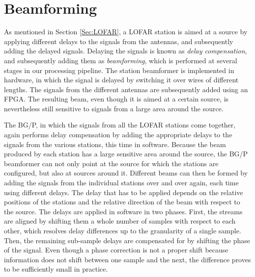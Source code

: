 \documentclass{llncs}
\begin{document}

\section{Beamforming}
\label{Sec:Beamforming}

As mentioned in Section \ref{Sec:LOFAR}, a LOFAR station is aimed at a source by applying different delays to the signals from the antennas, and subsequently adding the delayed signals. Delaying the signals is known as \emph{delay compensation}, and subsequently adding them as \emph{beamforming}, which is performed at several stages in our processing pipeline. The station beamformer is implemented in hardware, in which the signal is delayed by switching it over wires of different lengths. The signals from the different antennas are subsequently added using an FPGA. The resulting beam, even though it is aimed at a certain source, is nevertheless still sensitive to signals from a large area around the source.

The BG/P, in which the signals from all the LOFAR stations come together, again performs delay compensation by adding the appropriate delays to the signals from the various stations, this time in software. Because the beam produced by each station has a large sensitive area around the source, the BG/P beamformer can not only point at the source for which the stations are configured, but also at sources around it. Different beams can then be formed by adding the signals from the individual stations over and over again, each time using different delays. The delay that has to be applied depends on the relative positions of the stations and the relative direction of the beam with respect to the source. The delays are applied in software in two phases. First, the streams are aligned by shifting them a whole number of samples with respect to each other, which resolves delay differences up to the granularity of a single sample. Then, the remaining sub-sample delays are compensated for by shifting the phase of the signal. Even though a phase correction is not a proper shift because information does not shift between one sample and the next, the difference proves to be sufficiently small in practice.
\end{document}

